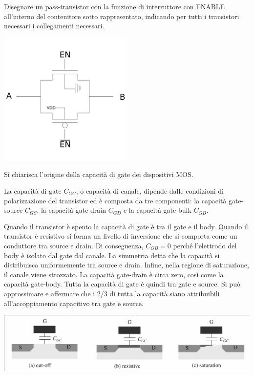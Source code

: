 \documentclass[answers,a4paper,12pt]{exam}
\begin{document}
\begin{questions}
\question Disegnare un pass-transistor con la funzione di interruttore con ENABLE all’interno del contenitore sotto rappresentato, indicando per tutti i transistori necessari i collegamenti necessari.
\begin{solutionorbox}[5cm]
{\centering

\includegraphics[width=0.5\textwidth]{PassTransistor.png}

}
\end{solutionorbox}
\question Si chiarisca l’origine della capacità di gate dei dispositivi MOS.
\begin{solutionorbox}[5cm]
La capacità di gate $C_{GC}$, o capacità di canale, dipende dalle condizioni di polarizzazione del transistor ed è composta da tre componenti: la capacità gate-source $C_{GS}$, la capacità gate-drain $C_{GD}$ e la capacità gate-bulk $C_{GB}$.


Quando il transistor è spento la capacità di gate è tra il gate e il body.
Quando il transistor è resistivo si forma un livello di inversione che si comporta come un conduttore tra source e drain. 
Di conseguenza, $C_{GB} = 0$ perché l'elettrodo del body è isolato dal gate dal canale. 
La simmetria detta che la capacità si distribuisca uniformemente tra source e drain.
Infine, nella regione di saturazione, il canale viene strozzato.
La capacità gate-drain è circa zero, così come la capacità gate-body. 
Tutta la capacità di gate è quindi tra gate e source. 
Si può approssimare e affermare che i 2/3 di tutta la capacità siano attribuibili all'accoppiamento capacitivo tra gate e source.

{\centering

\includegraphics[width=\textwidth]{CapacitaGate.png}

}
\end{solutionorbox}
\end{questions}
\end{document}

